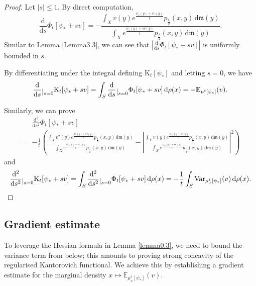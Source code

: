 \documentclass[a4paper,11pt]{article}
\numberwithin{equation}{section}
\theoremstyle{plain}
\theoremstyle{definition}
\theoremstyle{remark}
\newcommand{\mm}{\mathfrak m}
\newcommand{\E}{\mathbb{E}}
\newcommand{\K}{\mathrm{K}}
\renewcommand{\d}{{\mathrm d}}
\newcommand{\restr}[1]{\lower3pt\hbox{$|_{#1}$}}
\begin{document}
	\begin{proof}
		Let $|s| \leq 1$.
		By direct computation,
		\begin{equation*}
			\frac{\d}{\d s}\Phi_t[\psi_*+sv]=-\frac{\int_{X} v(y)e^{\frac{\psi_*(y)+sv(y)}{t}} p_\frac{t}{2}(x,y)\,\d\mm(y)}{\int_{X} e^{\frac{\psi_*(y)+sv(y)}{t}} p_\frac{t}{2}(x,y)\,\d\mm(y)}.
		\end{equation*}
		Similar to Lemma \ref{Lemma3.3},  we can see that
		$\left|\frac{\d}{\d s}\Phi_t[\psi_*+sv]\right|$
		 is uniformly bounded in $s$.
		 
		By differentiating under the integral defining ${\K}_t[\psi_*]$ and letting $s=0$, we have
		\begin{equation*}
			\frac{\d}{\d s}\restr{s=0}{\K}_t[\psi_*+sv]=\int_S \frac{\d}{\d s}\restr{s=0}\Phi_t[\psi_*+sv]\,\d\rho(x)=- \E_{\mu^t[\psi_*]}(v).
		\end{equation*}
		
		Similarly,    we can prove
		\begin{equation*}
			\begin{aligned}
				&\frac{\d^2}{\d s^2}\Phi_t[\psi_*+sv]\\
				=&-\frac{1}{t}\left(\frac{\int_{X} v^2(y)e^{\frac{\psi_*(y)+sv(y)}{t}}p_\frac{t}{2}(x,y)\,\d\mm(y)}{\int_{X} e^{\frac{\psi_*(y)+sv(y)}{t}}p_\frac{t}{2}(x,y)\,\d\mm(y)}
				-\left|\frac{\int_{X} v(y) e^{\frac{\psi_*(y)+sv(y)}{t}} p_\frac{t}{2}(x,y)\,\d\mm(y)}{\int_{X} e^{\frac{\psi_*(y)+sv(y)}{t}} p_\frac{t}{2}(x,y)\,\d\mm(y)}\right|^2\right)
			\end{aligned}
		\end{equation*}
		and
		\begin{equation*}
			\frac{\d^2}{\d s^2}\restr{s=0}{\K}_t[\psi_*+sv]=\int_S \frac{\d^2}{\d s^2}\restr{s=0}\Phi_t[\psi_*+sv]\,\d\rho(x)=-\frac{1}{t}\int_S {\rm{Var}}_{ \mu_x^t[\psi_*]}(v)\,\d\rho(x).
		\end{equation*}
	\end{proof}
	
	
	
	
	
	\subsection{Gradient estimate}
	To leverage the Hessian formula in Lemma \ref{lemma0.3}, we need to bound the variance term from below; this amounts to proving strong concavity of the regularised Kantorovich functional.  We achieve this by establishing a gradient estimate for the marginal density $x \mapsto \E_{\mu_x^t[\psi_*]}(v)$. 
	
\end{document}
